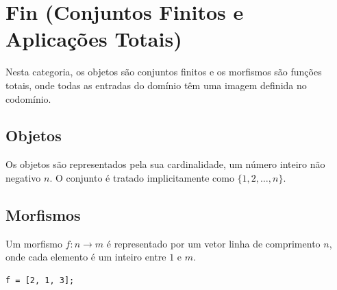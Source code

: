 \section{Fin (Conjuntos Finitos e Aplicações Totais)}

Nesta categoria, os objetos são conjuntos finitos e os morfismos são funções totais, onde todas as entradas do domínio têm uma imagem definida no codomínio.

\subsection{Objetos}
Os objetos são representados pela sua cardinalidade, um número inteiro não negativo $n$. O conjunto é tratado implicitamente como $\{1, 2, \dots, n\}$.

\subsection{Morfismos}
Um morfismo $f: n \to m$ é representado por um vetor linha de comprimento $n$, onde cada elemento é um inteiro entre $1$ e $m$.

\begin{lstlisting}[caption={Exemplo de Morfismo: f = [2, 1, 3]}]
% Representa f(1)=2, f(2)=1, f(3)=3
f = [2, 1, 3]; 
\end{lstlisting}